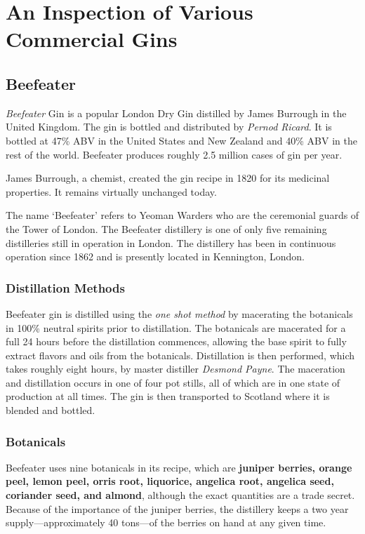 \section{An Inspection of Various Commercial Gins}

\subsection{Beefeater}
\emph{Beefeater} Gin is a popular London Dry Gin
distilled by James Burrough in the United Kingdom. The gin is bottled and
distributed by \emph{Pernod Ricard}. It is bottled at
47\% ABV in the United States and New Zealand and 40\% ABV in the rest of the
world. Beefeater produces roughly 2.5 million cases of gin per year.

James Burrough, a chemist, created the gin recipe in 1820 for its medicinal
properties. It remains virtually unchanged today.

The name `Beefeater' refers to Yeoman Warders who are the ceremonial guards of
the Tower of London. The Beefeater distillery is one of only five remaining
distilleries still in operation in London. The distillery has been in
continuous operation since 1862 and is presently located in Kennington, London.

\subsubsection{Distillation Methods}
Beefeater gin is distilled using the \emph{one shot
method} by macerating the botanicals in
100\% neutral spirits prior to distillation. The botanicals are macerated for a
full 24 hours before the distillation commences, allowing the base spirit to fully
extract flavors and oils from the botanicals. Distillation is then performed,
which takes roughly eight hours, by master distiller \emph{Desmond
Payne}. The maceration and distillation occurs in one
of four pot stills, all of which are in one state of production at all times.
The gin is then transported to Scotland where it is blended
and bottled.

\subsubsection{Botanicals}
Beefeater uses nine botanicals in its recipe, which are \textbf{juniper
berries, orange peel, lemon peel, orris root, liquorice, angelica root,
angelica seed, coriander seed, and almond}, although the exact quantities are a
trade secret. Because of the importance of the juniper berries, the distillery
keeps a two year supply---approximately 40 tons---of the berries on hand at any
given time. 

